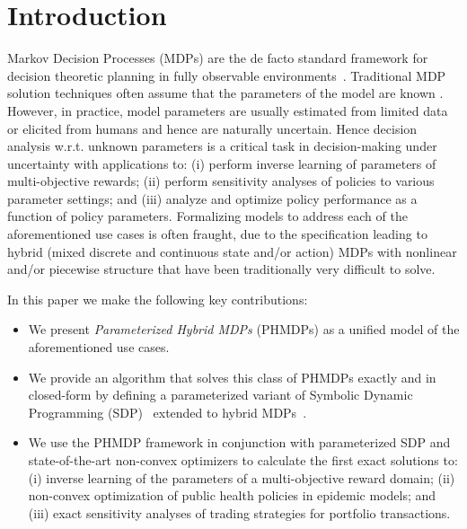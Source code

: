 \section{Introduction}
\label{sec:introduction}

Markov Decision Processes (MDPs)
are the de facto standard framework for decision theoretic planning in fully observable environments~\cite{Boutilier_JAIR_1999}. 
Traditional MDP solution techniques often assume that the parameters of the model are known
. However, in practice, model parameters are usually estimated from limited data or elicited from humans and hence are naturally uncertain.  Hence decision analysis w.r.t. unknown parameters is a critical task in decision-making under uncertainty with applications to: (i) perform inverse learning of parameters of multi-objective rewards; (ii) perform sensitivity analyses of policies to various parameter settings; and (iii) analyze and optimize policy performance as a function of policy parameters. Formalizing models to address each of the aforementioned use cases is often fraught, due to the specification leading to hybrid (mixed discrete and continuous state and/or action) MDPs with nonlinear and/or piecewise structure that have been traditionally very difficult to solve.

In this paper we make the following key contributions:
\begin{itemize}
\item We present {\it Parameterized Hybrid MDPs} (PHMDPs) as a unified model of the aforementioned use cases.
\item We provide an algorithm that solves this class of PHMDPs exactly and in closed-form by defining a parameterized variant of Symbolic Dynamic Programming (SDP)~\cite{Boutilier_IJCAI_2001} extended to hybrid MDPs~\cite{Sanner_UAI_2011}. 
\item We use the PHMDP framework in conjunction with parameterized SDP and state-of-the-art non-convex optimizers to calculate the first exact solutions to: (i) inverse learning of the parameters of a multi-objective reward domain; (ii) non-convex optimization of public health policies in epidemic models; and (iii) exact sensitivity analyses of trading strategies for portfolio transactions. 
\end{itemize}


